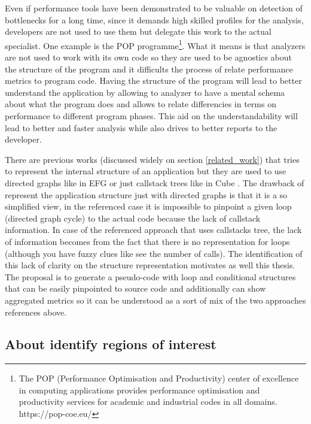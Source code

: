 Even if performance tools have been demonstrated to be valuable on detection of
bottlenecks for a long time, since it demands high skilled profiles for the
analysis, developers are not used to use them but delegate this work to the
actual specialist. One example is the POP programme\footnote{The POP
  (Performance Optimisation and Productivity) center of excellence in computing
  applications provides performance optimisation and productivity services for
academic and industrial codes in all domains. https://pop-coe.eu/}. What it
means is that analyzers are not used to work with its own code so they are used
to be agnostics about the structure of the program and it difficults the process
of relate performance metrics to program code. Having the structure of the
program will lead to better understand the application by allowing to analyzer
to have a mental schema about what the program does and allows to relate
differencies in terms on performance to different program phases. This aid on
the understandability will lead to better and faster analysis while also drives
to better reports to the developer.

There are previous works (discussed widely on section \ref{related_work})  that 
tries to represent the internal structure of an application but they are used to
use directed graphs like in EFG \cite{aguilar2016event} or just callstack trees like
in Cube \cite{saviankou2015cube}. The drawback of represent the application structure
just with directed graphs is that it is a so simplified view, in the referenced
case it is impossible to pinpoint a given loop (directed graph cycle) to the
actual code because the lack of callstack information. In case of the
referenced approach that uses callstacks tree, the lack of information becomes
from the fact that there is no representation for loops (although you have fuzzy
clues like see the number of calls). The identification of this lack of clarity
on the structure representation motivates as well this thesis. The proposal is to 
generate a pseudo-code with loop and conditional structures that can be easily 
pinpointed to source code and additionally can show aggregated metrics so it can 
be understood as a sort of mix of the two approaches references above.

\subsection{About identify regions of interest}

